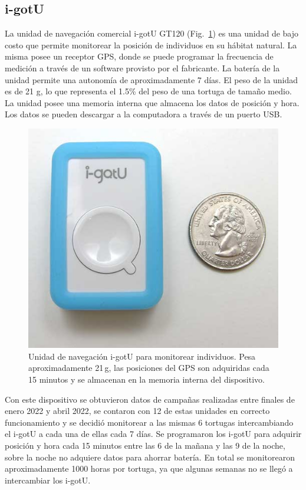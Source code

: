 \subsection{i-gotU}
La unidad de navegación comercial i-gotU GT120 (Fig.~\ref{fig:igotu}) es una unidad de bajo costo que permite monitorear la posición de individuos en su hábitat natural. La misma posee un receptor GPS, donde se puede programar la frecuencia de medición a través de un software provisto por el fabricante. La batería de la unidad permite una autonomía de aproximadamente 7 días. El peso de la unidad es de 21 g, lo que representa el 1.5\% del peso de una tortuga de tamaño medio. La unidad  posee una memoria interna que almacena los datos de posición y hora. Los datos se pueden descargar a la computadora a través de un puerto USB.
 
\begin{figure}[ht]
    \begin{center}
       
   
    \includegraphics[width=.8\imsize]{figs/Chap1/igotu.jpg}  
\end{center}
    \caption[Unidad de navegación comercial i-gotU para monitorear individuos.] {Unidad de navegación i-gotU para monitorear individuos. Pesa aproximadamente  21\,g, las posiciones del GPS son adquiridas cada 15 minutos y se almacenan en la memoria interna del dispositivo. }
    \label{fig:igotu}
\end{figure}
Con este dispositivo se obtuvieron datos de campañas realizadas entre finales de enero 2022 y abril 2022, se contaron con 12 de estas unidades en correcto funcionamiento y se decidió monitorear a las mismas 6 tortugas intercambiando el i-gotU a cada una de ellas cada 7 días. Se programaron los i-gotU para adquirir posición y hora cada 15 minutos entre las 6 de la mañana y las 9 de la noche, sobre la noche no adquiere datos para ahorrar batería. En total se monitorearon aproximadamente 1000 horas por tortuga, ya que algunas semanas no se llegó a intercambiar los i-gotU.
 
